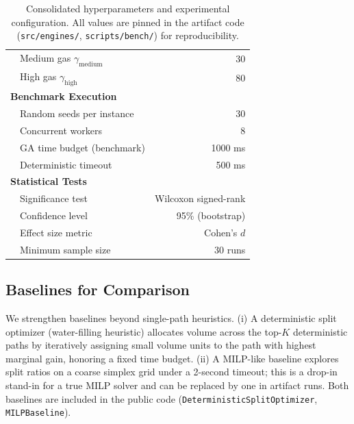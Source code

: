 \documentclass[11pt]{article}
\newcommand{\1}{\mathbf{1}}  %
\begin{document}
\begin{table}[t]
\begin{tabular}{llr}
  & Medium gas $\gamma_{\text{medium}}$ & 30 \\
  & High gas $\gamma_{\text{high}}$ & 80 \\
\midrule
\multicolumn{3}{l}{\textbf{Benchmark Execution}} \\
  & Random seeds per instance & 30 \\
  & Concurrent workers & 8 \\
  & GA time budget (benchmark) & 1000 ms \\
  & Deterministic timeout & 500 ms \\
\midrule
\multicolumn{3}{l}{\textbf{Statistical Tests}} \\
  & Significance test & Wilcoxon signed-rank \\
  & Confidence level & 95\% (bootstrap) \\
  & Effect size metric & Cohen's $d$ \\
  & Minimum sample size & 30 runs \\
\bottomrule
\end{tabular}
\caption{Consolidated hyperparameters and experimental configuration. All values are pinned in the artifact code (\texttt{src/engines/}, \texttt{scripts/bench/}) for reproducibility.}
\label{tab:hyperparams}
\end{table}

\subsection{Baselines for Comparison}
We strengthen baselines beyond single-path heuristics. (i) A deterministic split optimizer (water-filling heuristic) allocates volume across the top-$K$ deterministic paths by iteratively assigning small volume units to the path with highest marginal gain, honoring a fixed time budget. (ii) A MILP-like baseline explores split ratios on a coarse simplex grid under a 2-second timeout; this is a drop-in stand-in for a true MILP solver and can be replaced by one in artifact runs. Both baselines are included in the public code (\texttt{DeterministicSplitOptimizer}, \texttt{MILPBaseline}).
\end{document}
